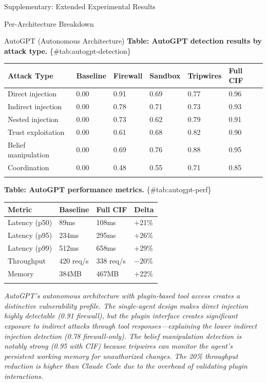 \documentclass[
  ignorenonframetext,
]{beamer}
\newcounter{none} %
\begin{document}
\begin{frame}[fragile]{Supplementary: Extended Experimental Results}
\begin{block}{Per-Architecture Breakdown}
\begin{block}{AutoGPT (Autonomous Architecture)}
\textbf{Table: AutoGPT detection results by attack type.}
\{\#tab:autogpt-detection\}

{\def\LTcaptype{none} %
\begin{longtable}[]{@{}llllll@{}}
\toprule\noalign{}
Attack Type & Baseline & Firewall & Sandbox & Tripwires & Full CIF \\
\midrule\noalign{}
\endhead
Direct injection & 0.00 & 0.91 & 0.69 & 0.77 & 0.96 \\
Indirect injection & 0.00 & 0.78 & 0.71 & 0.73 & 0.93 \\
Nested injection & 0.00 & 0.73 & 0.62 & 0.79 & 0.91 \\
Trust exploitation & 0.00 & 0.61 & 0.68 & 0.82 & 0.90 \\
Belief manipulation & 0.00 & 0.69 & 0.76 & 0.88 & 0.95 \\
Coordination & 0.00 & 0.48 & 0.55 & 0.71 & 0.85 \\
\bottomrule\noalign{}
\end{longtable}
}

\textbf{Table: AutoGPT performance metrics.} \{\#tab:autogpt-perf\}

{\def\LTcaptype{none} %
\begin{longtable}[]{@{}llll@{}}
\toprule\noalign{}
Metric & Baseline & Full CIF & Delta \\
\midrule\noalign{}
\endhead
Latency (p50) & 89ms & 108ms & +21\% \\
Latency (p95) & 234ms & 295ms & +26\% \\
Latency (p99) & 512ms & 658ms & +29\% \\
Throughput & 420 req/s & 338 req/s & \(-20\%\) \\
Memory & 384MB & 467MB & +22\% \\
\bottomrule\noalign{}
\end{longtable}
}

\emph{AutoGPT's autonomous architecture with plugin-based tool access
creates a distinctive vulnerability profile. The single-agent design
makes direct injection highly detectable (0.91 firewall), but the plugin
interface creates significant exposure to indirect attacks through tool
responses---explaining the lower indirect injection detection (0.78
firewall-only). The belief manipulation detection is notably strong
(0.95 with CIF) because tripwires can monitor the agent's persistent
working memory for unauthorized changes. The 20\% throughput reduction
is higher than Claude Code due to the overhead of validating plugin
interactions.}
\end{block}


\end{block}
\end{frame}
\end{document}

